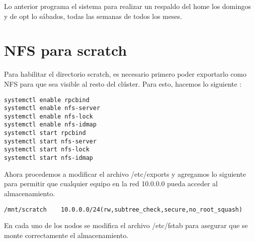 Lo anterior programa el sistema para realizar un respaldo del home los domingos y de opt lo sábados, todas las semanas de todos los meses.

\section{NFS para scratch}
Para habilitar el directorio scratch, es necesario primero poder exportarlo como NFS para que sea visible al resto del clúster. Para esto, hacemos lo siguiente \cite{nfs-server} \cite{nfs}:

\begin{lstlisting}
systemctl enable rpcbind
systemctl enable nfs-server
systemctl enable nfs-lock
systemctl enable nfs-idmap
systemctl start rpcbind
systemctl start nfs-server
systemctl start nfs-lock
systemctl start nfs-idmap
\end{lstlisting}

Ahora procedemos a modificar el archivo /etc/exports y agregamos lo siguiente para permitir que cualquier equipo en la red 10.0.0.0 pueda acceder al almacenamiento.

\begin{lstlisting}
/mnt/scratch	10.0.0.0/24(rw,subtree_check,secure,no_root_squash)
\end{lstlisting}

En cada uno de los nodos se modifica el archivo /etc/fstab para asegurar que se monte correctamente el almacenamiento.

\begin{lstlisting}

\end{lstlisting}

\clearpage
